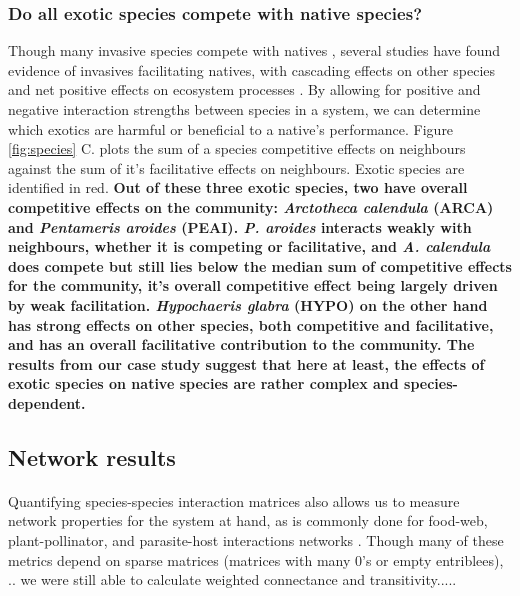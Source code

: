\documentclass[a4,12pt]{article}
\begin{document}
    \subsubsection*{Do all exotic species compete with native species?}
    Though many invasive species compete with natives \parencite{Naeem2000, Corbin2004, Riley2008, Zheng2015}, several studies have found evidence of invasives facilitating natives, with cascading effects on other species and net positive effects on ecosystem processes \parencite{Rodriguez2006, Ramus2017}. By allowing for positive and negative interaction strengths between species in a system, we can determine which exotics are harmful or beneficial to a native's performance. Figure \ref{fig:species} C. plots the sum of a species competitive effects on neighbours against the sum of it's facilitative effects on neighbours. Exotic species are identified in red. \textbf{Out of these three exotic species, two have overall competitive effects on the community: \textit{Arctotheca calendula} (ARCA) and \textit{Pentameris aroides} (PEAI). \textit{P. aroides} interacts weakly with neighbours, whether it is competing or facilitative, and \textit{A. calendula} does compete but still lies below the median sum of competitive effects for the community, it's overall competitive effect being largely driven by weak facilitation. \textit{Hypochaeris glabra} (HYPO) on the other hand has strong effects on other species, both competitive and facilitative, and has an overall facilitative contribution to the community. The results from our case study suggest that here at least, the effects of exotic species on native species are rather complex and species-dependent.}

    
    \subsection{Network results}

    \paragraph{}
    Quantifying species-species interaction matrices also allows us to measure network properties for the system at hand, as is commonly done for food-web, plant-pollinator, and parasite-host interactions networks \cite{}. Though many of these metrics depend on sparse matrices  (matrices with many 0's or empty entriblees), .. we were still able to calculate weighted connectance and transitivity.....
    
\end{document}
